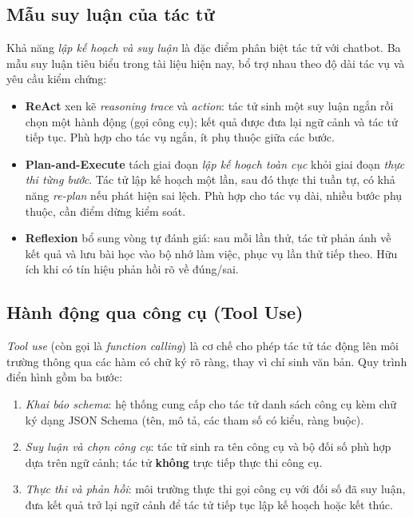 \subsection{Mẫu suy luận của tác tử}
\label{subsec:agent-patterns}

Khả năng \textit{lập kế hoạch và suy luận} là đặc điểm phân biệt tác tử với chatbot. Ba mẫu suy luận tiêu biểu trong tài liệu hiện nay, bổ trợ nhau theo độ dài tác vụ và yêu cầu kiểm chứng:

\begin{itemize}
  \item \textbf{ReAct} \cite{yao2023react} xen kẽ \textit{reasoning trace} và \textit{action}: tác tử sinh một suy luận ngắn rồi chọn một hành động (gọi công cụ); kết quả được đưa lại ngữ cảnh và tác tử tiếp tục. Phù hợp cho tác vụ ngắn, ít phụ thuộc giữa các bước.
  \item \textbf{Plan-and-Execute} \cite{plan_and_execute_2023} tách giai đoạn \textit{lập kế hoạch toàn cục} khỏi giai đoạn \textit{thực thi từng bước}. Tác tử lập kế hoạch một lần, sau đó thực thi tuần tự, có khả năng \textit{re-plan} nếu phát hiện sai lệch. Phù hợp cho tác vụ dài, nhiều bước phụ thuộc, cần điểm dừng kiểm soát.
  \item \textbf{Reflexion} \cite{shinn_reflexion_2023} bổ sung vòng tự đánh giá: sau mỗi lần thử, tác tử phản ánh về kết quả và lưu bài học vào bộ nhớ làm việc, phục vụ lần thử tiếp theo. Hữu ích khi có tín hiệu phản hồi rõ về đúng/sai.
\end{itemize}

\subsection{Hành động qua công cụ (Tool Use)}
\label{subsec:tool-use}

\textit{Tool use} (còn gọi là \textit{function calling}) \cite{schick2023toolformer,yao2023react} là cơ chế cho phép tác tử tác động lên môi trường thông qua các hàm có chữ ký rõ ràng, thay vì chỉ sinh văn bản. Quy trình điển hình gồm ba bước:
\begin{enumerate}
  \item \textit{Khai báo schema}: hệ thống cung cấp cho tác tử danh sách công cụ kèm chữ ký dạng JSON Schema (tên, mô tả, các tham số có kiểu, ràng buộc).
  \item \textit{Suy luận và chọn công cụ}: tác tử sinh ra tên công cụ và bộ đối số phù hợp dựa trên ngữ cảnh; tác tử \textbf{không} trực tiếp thực thi công cụ.
  \item \textit{Thực thi và phản hồi}: môi trường thực thi gọi công cụ với đối số đã suy luận, đưa kết quả trở lại ngữ cảnh để tác tử tiếp tục lập kế hoạch hoặc kết thúc.
\end{enumerate}

